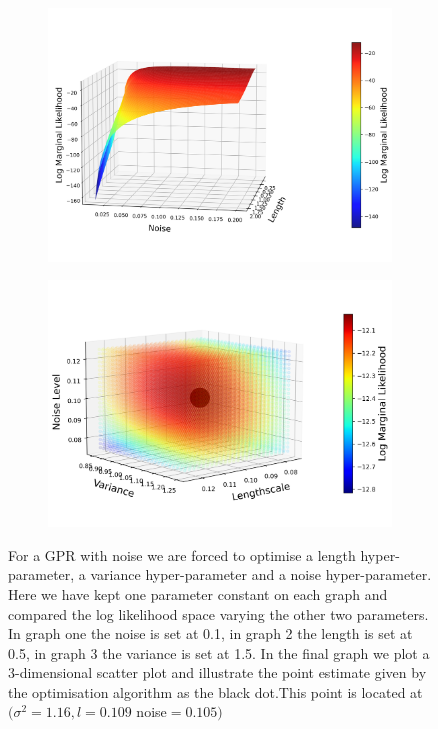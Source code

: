 \documentclass{article}
\begin{document}
\begin{figure}[H]
    \begin{subfigure}[b]{0.4\textwidth}
        \centering
        \includegraphics[width=\textwidth]{LatexPlots/1dplots/lengthvsnoise.png}
    \end{subfigure}
    \hspace{0.05\textwidth}
    \begin{subfigure}[b]{0.4\textwidth}
        \centering
        \includegraphics[width=\textwidth]{LatexPlots/1dplots/LogLike3params.png}
    \end{subfigure}
    \caption{For a GPR with noise we are forced to optimise a length hyper-parameter, a variance hyper-parameter and a noise hyper-parameter. 
    Here we have kept one parameter constant on each graph and compared the log likelihood space varying the other two parameters. 
    In graph one the noise is set at 0.1, in graph 2 the length is set at 0.5, in graph 3 the variance is set at 1.5. 
    In the final graph we plot a 3-dimensional scatter plot and illustrate the point estimate given by the optimisation algorithm as the black dot.This point is located at
    $(\sigma^2 = 1.16, l = 0.109$ noise$ = 0.105)$}
   \label{figure: Optimising Hyper-params}
\end{figure} 
\end{document}
